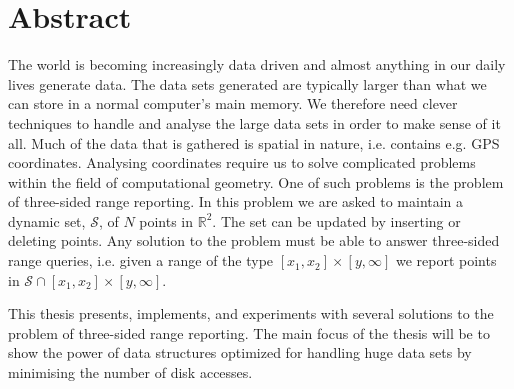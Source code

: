 \documentclass[twoside,11pt,openright]{report}
\begin{document}
\pagestyle{empty} 
\vspace*{\fill}
\clearpage



\chapter*{Abstract}
\pagestyle{plain}

The world is becoming increasingly data driven and almost anything in our daily lives generate data. The data sets generated are typically larger than what we can store in a normal computer's main memory. We therefore need clever techniques to handle and analyse the large data sets in order to make sense of it all. Much of the data that is gathered is spatial in nature, i.e. contains e.g. GPS coordinates. Analysing coordinates require us to solve complicated problems within the field of computational geometry. One of such problems is the problem of three-sided range reporting. In this problem we are asked to maintain a dynamic set, $\mathcal{S}$, of $N$ points in $\mathbb{R}^2$. The set can be updated by inserting or deleting points. Any solution to the problem must be able to answer three-sided range queries, i.e. given a range of the type $\left[x_1,x_2\right]\times \left[y,\infty\right]$ we report points in $\mathcal{S} \cap \left[x_1,x_2\right]\times \left[y,\infty\right]$.

This thesis presents, implements, and experiments with several solutions to the problem of three-sided range reporting. The main focus of the thesis will be to show the power of data structures optimized for handling huge data sets by minimising the number of disk accesses.
\end{document}

